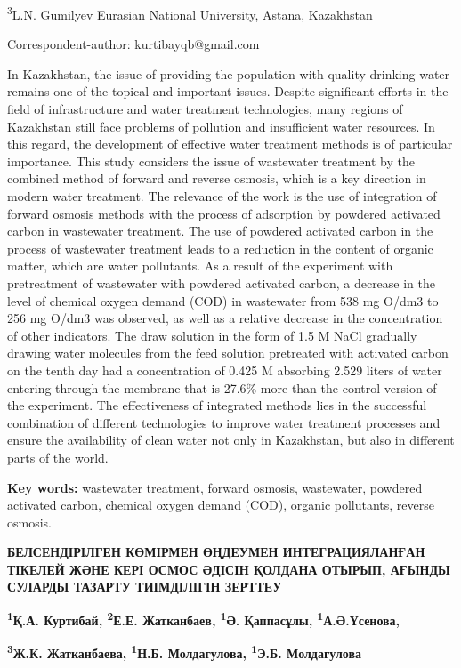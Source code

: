\textsuperscript{3}L.N. Gumilyev Eurasian National University, Astana,
Kazakhstan

Correspondent-author: kurtibayqb@gmail.com

In Kazakhstan, the issue of providing the population with quality
drinking water remains one of the topical and important issues. Despite
significant efforts in the field of infrastructure and water treatment
technologies, many regions of Kazakhstan still face problems of
pollution and insufficient water resources. In this regard, the
development of effective water treatment methods is of particular
importance. This study considers the issue of wastewater treatment by
the combined method of forward and reverse osmosis, which is a key
direction in modern water treatment. The relevance of the work is the
use of integration of forward osmosis methods with the process of
adsorption by powdered activated carbon in wastewater treatment. The use
of powdered activated carbon in the process of wastewater treatment
leads to a reduction in the content of organic matter, which are water
pollutants. As a result of the experiment with pretreatment of
wastewater with powdered activated carbon, a decrease in the level of
chemical oxygen demand (COD) in wastewater from 538 mg O/dm3 to 256 mg
O/dm3 was observed, as well as a relative decrease in the concentration
of other indicators. The draw solution in the form of 1.5 M NaCl
gradually drawing water molecules from the feed solution pretreated with
activated carbon on the tenth day had a concentration of 0.425 M
absorbing 2.529 liters of water entering through the membrane that is
27.6\% more than the control version of the experiment. The
effectiveness of integrated methods lies in the successful combination
of different technologies to improve water treatment processes and
ensure the availability of clean water not only in Kazakhstan, but also
in different parts of the world.

{\bfseries Key words:} wastewater treatment, forward osmosis, wastewater,
powdered activated carbon, chemical oxygen demand (COD), organic
pollutants, reverse osmosis.

{\bfseries БЕЛСЕНДІРІЛГЕН КӨМІРМЕН ӨҢДЕУМЕН ИНТЕГРАЦИЯЛАНҒАН ТІКЕЛЕЙ ЖӘНЕ
КЕРІ ОСМОС ӘДІСІН ҚОЛДАНА ОТЫРЫП, АҒЫНДЫ СУЛАРДЫ ТАЗАРТУ ТИІМДІЛІГІН
ЗЕРТТЕУ}

{\bfseries \textsuperscript{1}Қ.А. Куртибай, \textsuperscript{2}Е.Е.
Жатканбаев, \textsuperscript{1}Ә. Қаппасұлы,
\textsuperscript{1}А.Ә.Үсенова,}

{\bfseries \textsuperscript{3}Ж.К. Жатканбаева, \textsuperscript{1}Н.Б.
Молдагулова, \textsuperscript{1}Э.Б. Молдагулова}

